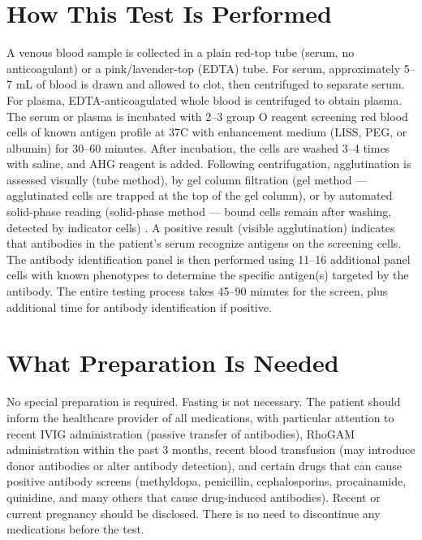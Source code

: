 \section*{How This Test Is Performed}
A venous blood sample is collected in a plain red-top tube (serum, no anticoagulant) or a pink/lavender-top (EDTA) tube. For serum, approximately 5--7 mL of blood is drawn and allowed to clot, then centrifuged to separate serum. For plasma, EDTA-anticoagulated whole blood is centrifuged to obtain plasma. The serum or plasma is incubated with 2--3 group O reagent screening red blood cells of known antigen profile at 37\textdegree{}C with enhancement medium (LISS, PEG, or albumin) for 30--60 minutes. After incubation, the cells are washed 3--4 times with saline, and AHG reagent is added. Following centrifugation, agglutination is assessed visually (tube method), by gel column filtration (gel method --- agglutinated cells are trapped at the top of the gel column), or by automated solid-phase reading (solid-phase method --- bound cells remain after washing, detected by indicator cells) \cite{aabb2017technical}. A positive result (visible agglutination) indicates that antibodies in the patient's serum recognize antigens on the screening cells. The antibody identification panel is then performed using 11--16 additional panel cells with known phenotypes to determine the specific antigen(s) targeted by the antibody. The entire testing process takes 45--90 minutes for the screen, plus additional time for antibody identification if positive.

\section*{What Preparation Is Needed}
No special preparation is required. Fasting is not necessary. The patient should inform the healthcare provider of all medications, with particular attention to recent IVIG administration (passive transfer of antibodies), RhoGAM administration within the past 3 months, recent blood transfusion (may introduce donor antibodies or alter antibody detection), and certain drugs that can cause positive antibody screens (methyldopa, penicillin, cephalosporins, procainamide, quinidine, and many others that cause drug-induced antibodies). Recent or current pregnancy should be disclosed. There is no need to discontinue any medications before the test.

